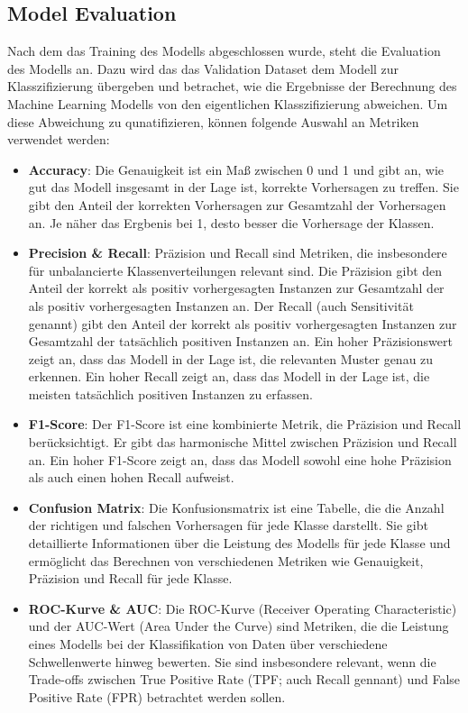 \documentclass[conference]{IEEEtran}
\begin{document}
\subsection{Model Evaluation}

Nach dem das Training des Modells abgeschlossen wurde, steht die Evaluation des Modells an. 
Dazu wird das das Validation Dataset dem Modell zur Klasszifizierung übergeben und betrachet, wie die Ergebnisse der Berechnung des Machine Learning Modells von den eigentlichen Klasszifizierung abweichen.
Um diese Abweichung zu qunatifizieren, können folgende Auswahl an Metriken verwendet werden:

\begin{itemize}
    \item \textbf{Accuracy}: Die Genauigkeit ist ein Maß zwischen 0 und 1 und gibt an, wie gut das Modell insgesamt in der Lage ist, korrekte Vorhersagen zu treffen. Sie gibt den Anteil der korrekten Vorhersagen zur Gesamtzahl der Vorhersagen an. Je näher das Ergbenis bei 1, desto besser die Vorhersage der Klassen.
    \item \textbf{Precision \& Recall}: Präzision und Recall sind Metriken, die insbesondere für unbalancierte Klassenverteilungen relevant sind. Die Präzision gibt den Anteil der korrekt als positiv vorhergesagten Instanzen zur Gesamtzahl der als positiv vorhergesagten Instanzen an. Der Recall (auch Sensitivität genannt) gibt den Anteil der korrekt als positiv vorhergesagten Instanzen zur Gesamtzahl der tatsächlich positiven Instanzen an. 
    Ein hoher Präzisionswert zeigt an, dass das Modell in der Lage ist, die relevanten Muster genau zu erkennen. Ein hoher Recall zeigt an, dass das Modell in der Lage ist, die meisten tatsächlich positiven Instanzen zu erfassen. 
    \item \textbf{F1-Score}: Der F1-Score ist eine kombinierte Metrik, die Präzision und Recall berücksichtigt. Er gibt das harmonische Mittel zwischen Präzision und Recall an. Ein hoher F1-Score zeigt an, dass das Modell sowohl eine hohe Präzision als auch einen hohen Recall aufweist.
    \item \textbf{Confusion Matrix}: Die Konfusionsmatrix ist eine Tabelle, die die Anzahl der richtigen und falschen Vorhersagen für jede Klasse darstellt. Sie gibt detaillierte Informationen über die Leistung des Modells für jede Klasse und ermöglicht das Berechnen von verschiedenen Metriken wie Genauigkeit, Präzision und Recall für jede Klasse.
    \item \textbf{ROC-Kurve \& AUC}: Die ROC-Kurve (Receiver Operating Characteristic) und der AUC-Wert (Area Under the Curve) sind Metriken, die die Leistung eines Modells bei der Klassifikation von Daten über verschiedene Schwellenwerte hinweg bewerten. Sie sind insbesondere relevant, wenn die Trade-offs zwischen True Positive Rate (TPF; auch Recall gennant) und False Positive Rate (FPR) betrachtet werden sollen. 

\end{itemize}
\end{document}

